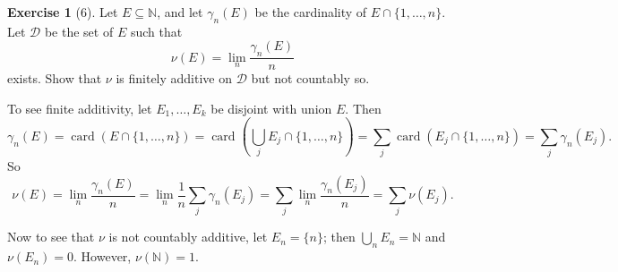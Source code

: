 \documentclass[10pt]{article}
\newcommand{\NN}{\mathbb{N}}
\newcommand{\card}{\operatorname{card}}
\theoremstyle{definition}
\newtheorem{exer}{Exercise}
\begin{document}
\begin{exer}[6]
Let $E \subseteq \NN$, and let $\gamma_n(E)$ be the cardinality of $E \cap \{1, \dots, n\}$. Let $\mathcal D$ be the set of $E$ such that
$$\nu(E) = \lim_n \frac{\gamma_n(E)}{n}$$
exists. Show that $\nu$ is finitely additive on $\mathcal D$ but not countably so.
\end{exer}

To see finite additivity, let $E_1, \dots, E_k$ be disjoint with union $E$. Then
$$\gamma_n(E) = \card(E \cap \{1, \dots, n\}) = \card\left(\bigcup_j E_j \cap \{1, \dots, n\}\right) = \sum_j \card(E_j \cap \{1, \dots, n\}) = \sum_j \gamma_n(E_j).$$
So
$$\nu(E) = \lim_n \frac{\gamma_n(E)}{n} = \lim_n \frac{1}{n} \sum_j \gamma_n(E_j) = \sum_j \lim_n \frac{\gamma_n(E_j)}{n} = \sum_j \nu(E_j).$$

Now to see that $\nu$ is not countably additive, let $E_n = \{n\}$; then $\bigcup_n E_n = \NN$ and $\nu(E_n) = 0$. However, $\nu(\NN) = 1$.
\end{document}
